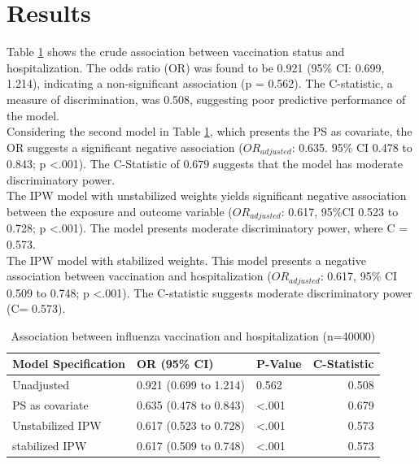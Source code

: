 \documentclass[
]{article}
\begin{document}
\hypertarget{results}{%
\section{Results}\label{results}}

Table \ref{tab:res} shows the crude association between vaccination status and hospitalization. The odds ratio (OR) was found to be 0.921 (95\% CI: 0.699, 1.214), indicating a non-significant association (p = 0.562). The C-statistic, a measure of discrimination, was 0.508, suggesting poor predictive performance of the model.\\
\hspace*{0.333em}\hspace*{0.333em}\hspace*{0.333em}\hspace*{0.333em}Considering the second model in Table \ref{tab:res}, which presents the PS as covariate, the OR suggests a significant negative association (\(OR_{adjusted}\): 0.635. 95\% CI 0.478 to 0.843; p \textless.001). The C-Statistic of 0.679 suggests that the model has moderate discriminatory power.\\
\hspace*{0.333em}\hspace*{0.333em}\hspace*{0.333em}\hspace*{0.333em}The IPW model with unstabilized weights yields significant negative association between the exposure and outcome variable (\(OR_{adjusted}\): 0.617, 95\%CI 0.523 to 0.728; p \textless.001). The model presents moderate discriminatory power, where C = 0.573.\\
\hspace*{0.333em}\hspace*{0.333em}\hspace*{0.333em}\hspace*{0.333em}The IPW model with stabilized weights. This model presents a negative association between vaccination and hospitalization (\(OR_{adjusted}\): 0.617, 95\% CI 0.509 to 0.748; p \textless.001). The C-statistic suggests moderate discriminatory power (C= 0.573).

\begin{table}[!h]

\caption{\label{tab:res}Association between influenza vaccination and hospitalization (n=40000)}
\centering
\begin{tabular}[t]{lllr}
\toprule
Model Specification & OR (95\% CI) & P-Value & C-Statistic\\
\midrule
Unadjusted & 0.921 (0.699 to 1.214) & 0.562 & 0.508\\
PS as covariate & 0.635 (0.478 to 0.843) & <.001 & 0.679\\
Unstabilized IPW & 0.617 (0.523 to 0.728) & <.001 & 0.573\\
stabilized IPW & 0.617 (0.509 to 0.748) & <.001 & 0.573\\
\bottomrule
\end{tabular}
\end{table}
\end{document}

